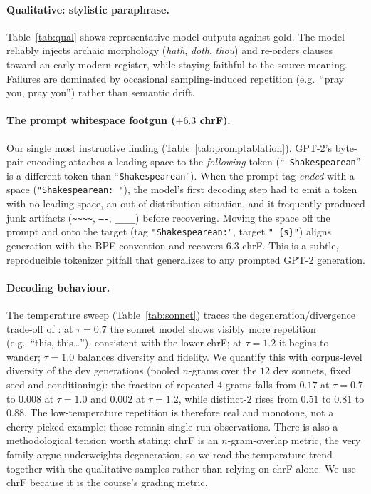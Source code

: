\documentclass[10pt,twocolumn]{article}
\begin{document}
\paragraph{Qualitative: stylistic paraphrase.}
Table~\ref{tab:qual} shows representative model outputs against gold. The model
reliably injects archaic morphology (\emph{hath}, \emph{doth}, \emph{thou}) and
re-orders clauses toward an early-modern register, while staying faithful to the
source meaning. Failures are dominated by occasional sampling-induced repetition
(e.g.\ ``pray you, pray you'') rather than semantic drift.

\paragraph{The prompt whitespace footgun ($+6.3$ chrF).}
Our single most instructive finding (Table~\ref{tab:promptablation}). GPT-2's
byte-pair encoding attaches a leading space to the \emph{following} token
(``\texttt{ Shakespearean}'' is a different token than ``\texttt{Shakespearean}'').
When the prompt tag \emph{ended} with a space (\texttt{"Shakespearean: "}), the
model's first decoding step had to emit a token with no leading space, an
out-of-distribution situation, and it frequently produced junk artifacts
(\texttt{\~{}\~{}\~{}\~{}}, \texttt{----}, \texttt{\_\_\_\_}) before recovering.
Moving the space off the prompt and onto the target (tag
\texttt{"Shakespearean:"}, target \texttt{" \{s\}"}) aligns generation with the
BPE convention and recovers $6.3$ chrF. This is a subtle, reproducible tokenizer
pitfall that generalizes to any prompted GPT-2 generation.

\paragraph{Decoding behaviour.}
The temperature sweep (Table~\ref{tab:sonnet}) traces the
degeneration/divergence trade-off of \cite{holtzman2020curious}: at $\tau=0.7$ the
sonnet model shows visibly more repetition (e.g.\ ``this, this\ldots''),
consistent with the lower chrF; at $\tau=1.2$ it begins to wander; $\tau=1.0$
balances diversity and fidelity. We quantify this with corpus-level diversity of
the dev generations (pooled $n$-grams over the $12$ dev sonnets, fixed seed and
conditioning): the fraction of repeated $4$-grams falls from $0.17$ at
$\tau{=}0.7$ to $0.008$ at $\tau{=}1.0$ and $0.002$ at $\tau{=}1.2$, while
distinct-$2$ rises from $0.51$ to $0.81$ to $0.88$. The low-temperature
repetition is therefore real and monotone, not a cherry-picked example; these
remain single-run observations. There is also a methodological tension worth
stating: chrF is an $n$-gram-overlap metric, the
very family \cite{holtzman2020curious} argue underweights degeneration, so we
read the temperature trend together with the qualitative samples rather than
relying on chrF alone. We use chrF because it is the course's grading metric.
\end{document}
